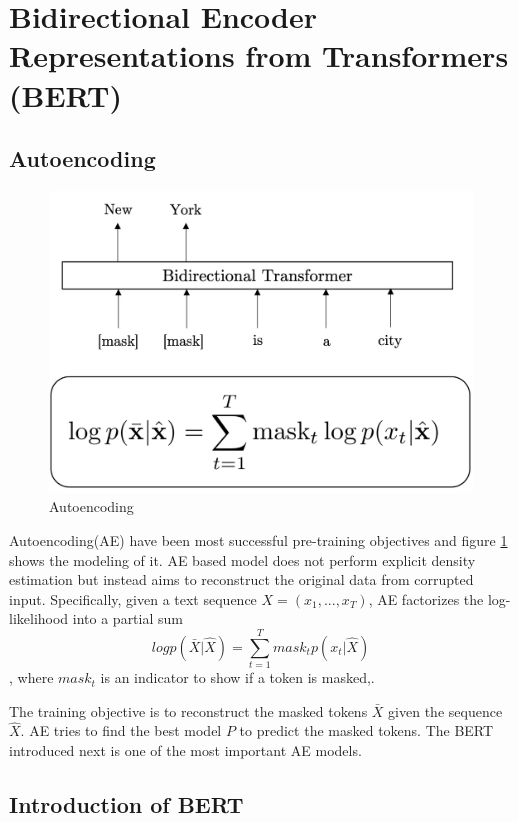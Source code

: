 \documentclass[]{krantz}
\begin{document}
\hypertarget{bidirectional-encoder-representations-from-transformers-bert}{%
\section{Bidirectional Encoder Representations from Transformers (BERT)}\label{bidirectional-encoder-representations-from-transformers-bert}}

\hypertarget{autoencoding}{%
\subsection{Autoencoding}\label{autoencoding}}

\begin{figure}

{\centering \includegraphics[width=0.5\linewidth]{figures/02-03-transfer-learning-for-nlp/autoencoding} 

}

\caption{Autoencoding}\label{fig:ch02-03-figure01}
\end{figure}

Autoencoding(AE) have been most successful pre-training objectives and figure \ref{fig:ch02-03-figure01} shows the modeling of it. AE based model does not perform explicit density estimation but instead aims to reconstruct the original data from corrupted input. Specifically, given a text sequence \(X = (x_1,...,x_T)\), AE factorizes the log-likelihood into a partial sum \[log p(\bar{X}|\hat{X}) = \sum^T_{t=1} mask_t p(x_t|\hat{X})\], where \(mask_t\) is an indicator to show if a token is masked,\citet{yang2019xlnet}.

The training objective is to reconstruct the masked tokens \(\bar{X}\) given the sequence \(\hat{X}\). AE tries to find the best model \(P\) to predict the masked tokens. The BERT introduced next is one of the most important AE models.

\hypertarget{introduction-of-bert}{%
\subsection{Introduction of BERT}\label{introduction-of-bert}}
\end{document}
